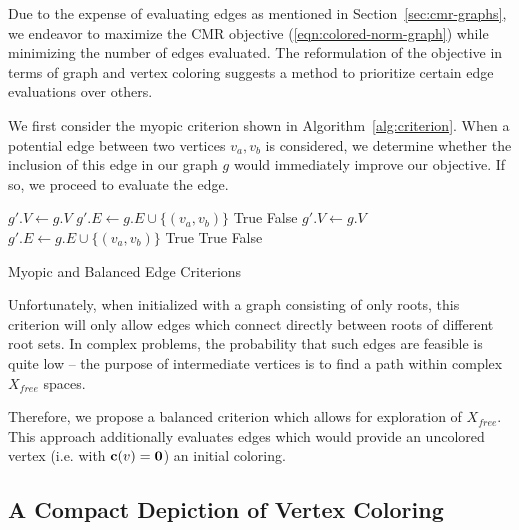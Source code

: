 \documentclass{report}
\begin{document}
Due to the expense of evaluating edges
as mentioned in Section~\ref{sec:cmr-graphs},
we endeavor to maximize the CMR objective
(\ref{eqn:colored-norm-graph})
while minimizing the number of edges evaluated.
The reformulation of the objective in terms of graph and vertex coloring
suggests a method to prioritize certain edge evaluations over others.

We first consider the myopic criterion
shown in Algorithm~\ref{alg:criterion}.
When a potential edge between two vertices $v_a,v_b$ is considered,
we determine whether the inclusion of this edge in our graph $g$
would immediately improve our objective.
If so, we proceed to evaluate the edge.

\begin{algorithm}[t!]
\begin{algorithmic}[1]
\State $g'.V \leftarrow g.V$
\State $g'.E \leftarrow g.E \cup \{(v_a, v_b)\}$
\State \Return True
\Else
\State \Return False
\EndIf
\EndFunction
{}%
\State $g'.V \leftarrow g.V$
\State $g'.E \leftarrow g.E \cup \{(v_a, v_b)\}$
\State \Return True
\State \Return True
\Else
\State \Return False
\EndIf
\EndFunction
\end{algorithmic}
\caption{Myopic and Balanced Edge Criterions}
\label{alg:criterion}
\end{algorithm}

Unfortunately, when initialized with a graph consisting of only
roots,
this criterion will only allow edges which connect directly
between roots of different root sets.
In complex problems, the probability that such edges are feasible
is quite low --
the purpose of intermediate vertices is to find a path within
complex $X_{free}$ spaces.

Therefore, we propose a balanced criterion which allows for exploration
of $X_{free}$.
This approach additionally evaluates edges which would provide an
uncolored vertex (i.e. with ${\bf c}(v) = {\bf 0}$) an initial coloring.

\subsection{A Compact Depiction of Vertex Coloring}
\end{document}

